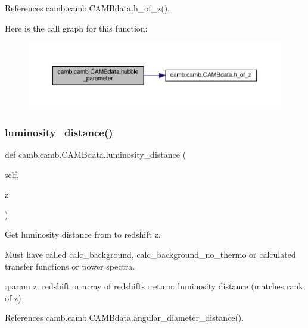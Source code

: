 References camb.\+camb.\+C\+A\+M\+Bdata.\+h\+\_\+of\+\_\+z().

Here is the call graph for this function\+:
\nopagebreak
\begin{figure}[H]
\begin{center}
\leavevmode
\includegraphics[width=350pt]{classcamb_1_1camb_1_1CAMBdata_ad9700493862b05ad5d794ffeae824049_cgraph}
\end{center}
\end{figure}
\mbox{\label{classcamb_1_1camb_1_1CAMBdata_abae42ef628ce5258f1b8ce60ccc91846}} 
\subsubsection{\texorpdfstring{luminosity\+\_\+distance()}{luminosity\_distance()}}
{\footnotesize\ttfamily def camb.\+camb.\+C\+A\+M\+Bdata.\+luminosity\+\_\+distance (\begin{DoxyParamCaption}\item[{}]{self,  }\item[{}]{z }\end{DoxyParamCaption})}

\begin{DoxyVerb}Get luminosity distance from to redshift z.

Must have called calc_background, calc_background_no_thermo or calculated transfer functions or power spectra.

:param z: redshift or array of redshifts
:return: luminosity distance (matches rank of z)
\end{DoxyVerb}
 

References camb.\+camb.\+C\+A\+M\+Bdata.\+angular\+\_\+diameter\+\_\+distance().

